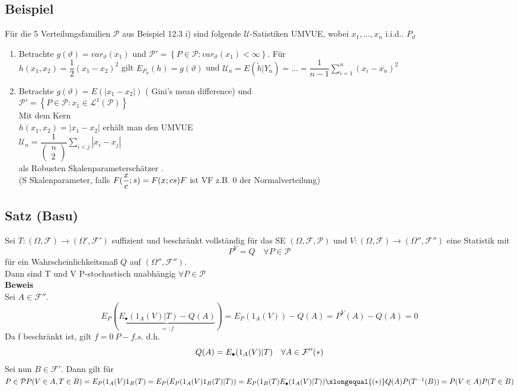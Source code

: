 \documentclass[german,10pt,oneside, fleqn, a4paper]{article}
\newcommand{\ra}{\rightarrow}
\newcommand{\sm}[2][\infty]{\sum\limits_{#2}^{#1}}
\newcommand{\brc}[1]{\left(#1\right)}
\newcommand{\brac}[1]{\left\lbrace #1\right\rbrace}
\newcommand{\mat}[1]{\begin{pmatrix}#1\end{pmatrix}}
\newcommand{\mc}[1]{\mathcal{#1}}
\newcommand{\lp}[1]{\mc{L}^{#1}}
\newcommand{\beweis}{\textbf{Beweis}\\}
\newcommand{\1}[1]{1_{#1}}
\newcommand{\2}[1]{\1{\brac{#1}}}
\newcommand{\rraum}{\brc{\Omega,\mc{F},\mc{P}}}
\newcommand{\f}{\mc{F}}
\newcommand{\p}{\mc{P}}
\newcommand{\uu}{\mc{U}}
\newcommand{\sumi}{\sm[n]{i=1}}
\newcommand{\qf}{\quad\forall}
\begin{document}
\begin{enumerate}[label=(\alph*)]
\begin{enumerate}[label=(\alph*)]
\subsection{Beispiel}
\label{12.7}
Für die 5 Verteilungsfamilien $\p$ aus Beispiel 12.3 i) sind folgende $\uu$-Satistiken UMVUE, wobei $x_1,...,x_n$ i.i.d.. $P_\vartheta$\begin{enumerate}[label=(\alph*)]
\item Betrachte $g(\vartheta)=var_\vartheta(x_1)$ und $\p'=\brac{P\in\p:var_\vartheta(x_1)<\infty}$. Für \\
$h(x_1,x_2)=\dfrac{1}{2}(x_1-x_2)^2$ gilt $E_{P_\vartheta}(h)=g(\vartheta)$ und $\uu_n=E(\tilde h|Y_n)=...=\dfrac{1}{n-1}\sumi (x_i-\overline{x_n})^2$
\item Betrachte $g(\vartheta)=E(|x_1-x_2|)$ ( Gini's mean difference) und\\
$\p'=\brac{P\in\p:x_1\in\lp{1}(\p)}$\\
Mit dem Kern \\
$h(x_1,x_2)=|x_1-x_2|$ erhält man den UMVUE\\
$\uu_n=\dfrac{1}{\mat{n\\2}}\sum\limits_{i<j}|x_i-x_j|$\\
als \glqq Robusten Skalenparameterschätzer \grqq.\\
(S Skalenparameter, falls $F(\dfrac{x}{c};s)=F(x;cs)\\
F$ ist VF z.B. 0 der Normalverteilung)
\end{enumerate}

\end{enumerate}
\end{enumerate}
\subsection{Satz (Basu)}
\label{12.8}
Sei $T:(\Omega,\f)\ra(\Omega',\f')$ suffizient und beschränkt vollständig für das SE $\rraum$ und $V:(\Omega,\f)\ra(\Omega'',\f'')$ eine Statistik mit \[
P^V=Q\qf P\in\p\]
für ein Wahrscheinlichkeitsmaß $Q$ auf $(\Omega'',\f'')$. \\
Dann sind T und V P-stochastisch unabhängig $\forall P \in\p$\\
\beweis 
Sei $A\in\f''$. \[
E_P(\underbrace{E_\bullet(1_A(V)|T)-Q(A)}_{=:f})=E_P(1_A(V))-Q(A)=P^V(A)-Q(A)=0\]
Da f beschränkt ist, gilt $f=0\ P-f.s.$ d.h. \[
Q(A)=E_\bullet(1_A(V)|T)\qf A\in\f''\hfill(*)\]
Sei nun $B\in\f'$. Dann gilt für $P\in\p\\
P(V\in A,T\in B)=E_P(1_A(V)1_B(T)=E_P(E_P(1_A(V)1_B(T)|T))=E_P(1_B(T)E_\bullet(1_A(V)|T))\xlongequal{(*)}Q(A)P(T^{-1}(B))=P(V\in A)P(T\in B)$\\
\end{document}
